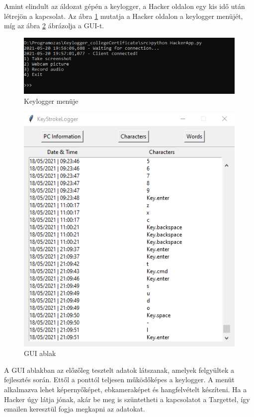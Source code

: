 \documentclass[12pt,a4paper,oneside]{report}
\begin{document}
Amint elindult az áldozat gépén a keylogger, a Hacker oldalon egy kis idő után létrejön a kapcsolat. Az ábra \ref{fig:winPC5} mutatja a Hacker oldalon a keylogger menüjét, míg az ábra \ref{fig:winPC6} ábrázolja a GUI-t.
\begin{figure}[H]
\centering
\includegraphics[width=450pt]{../images/windowsPC5}
\caption{Keylogger menüje}
\label{fig:winPC5}
\end{figure}
\begin{figure}[H]
\centering
\includegraphics[width=400pt]{../images/windowsPC6}
\caption{GUI ablak}
\label{fig:winPC6}
\end{figure}

A GUI ablakban az előzőleg tesztelt adatok látszanak, amelyek felgyültek a fejlesztés során. Ettől a ponttól teljesen működőképes a keylogger. A menüt alkalmazva lehet képernyőképet, ebkameraképet és hangfelvételt készíteni. Ha a Hacker úgy látja jónak, akár be meg is szüntetheti a kapcsolatot a Targettel, így emailen keresztül fogja megkapni az adatokat.
\end{document}
